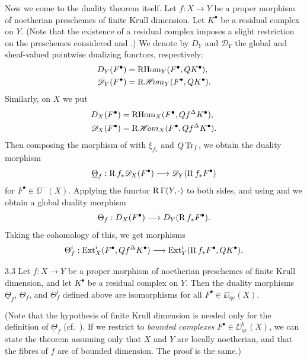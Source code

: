 Now we come to the duality theorem itself. Let $f: X \to Y$ be a proper morphism of noetherian preschemes of finite Krull dimension. Let $K^{\bullet}$ be a residual complex on $Y$. (Note that the existence of a residual complex imposes a slight restriction on the preschemes considered  and .) We denote by $D_Y$ and $\mathscr{D}_Y$ the global and sheaf-valued pointwise dualizing functors, respectively:
\[
\begin{aligned}
D_Y(F^\bullet)&=\operatorname{RHom}_Y(F^\bullet,QK^\bullet),\\
\mathscr{D}_Y(F^\bullet)&=\mathop{\mathrm{R}\mathscr{H}\!om}\nolimits_Y(F^\bullet,QK^\bullet).
\end{aligned}
\]
Similarly, on $X$ we put
\[
\begin{aligned}
D_X(F^\bullet)&=\operatorname{RHom}_X(F^\bullet,Qf^\Delta K^\bullet),\\
\mathscr{D}_X(F^\bullet)&=\mathop{\mathrm{R}\mathscr{H}\!om}\nolimits_X(F^\bullet,Qf^\Delta K^\bullet).
\end{aligned}
\] Then composing the morphism of  with $\xi_{f_*}$ and $Q\operatorname{Tr}_f$, we obtain the duality morphism
\[
\underline{\Theta}_{f} : \operatorname{R} f_{*} \mathscr{D}_{X}(F^{\bullet}) \longrightarrow \mathscr{D}_{Y}(\operatorname{R} f_{*}F^{\bullet})
\]
for $F^{\bullet} \in \DD^{-}(X)$. Applying the functor $\operatorname{R}\Gamma(Y, \cdot)$ to both sides, and using  and  we obtain a global duality morphism
\[
\Theta_{f} : D_{X}(F^{\bullet}) \longrightarrow D_{Y}(\operatorname{R} f_{*}F^{\bullet}).
\]
Taking the cohomology of this, we get morphisms
\[
\Theta_{f}^{i} : \operatorname{Ext}_{X}^{i}(F^{\bullet}, Q f^{\Delta} K^{\bullet}) \longrightarrow \operatorname{Ext}_{Y}^{i}(\operatorname{R} f_{*}F^{\bullet}, Q K^{\bullet}).
\]

\begin{booktheorem}{3.3}\label{thm:7.3.3} Let $f: X \to Y$ be a proper morphism of noetherian preschemes of finite Krull dimension, and let $K^{\bullet}$ be a residual complex on $Y$. Then the duality morphisms $\underline{\Theta}_{f}$, $\Theta_{f}$, and $\Theta_{f}^{i}$ defined above are isomorphisms for all $F^{\bullet} \in \DD_{\mathrm{qc}}^{-}(X)$.

(Note that the hypothesis of finite Krull dimension is needed only for the definition of $\underline{\Theta}_{f}$ (cf.\ ). If we restrict to \emph{bounded complexes} $F^{\bullet} \in \DD_{\mathrm{qc}}^{b}(X)$, we can state the theorem assuming only that $X$ and $Y$ are locally noetherian, and that the fibres of $f$ are of bounded dimension. The proof is the same.)
\end{booktheorem}

